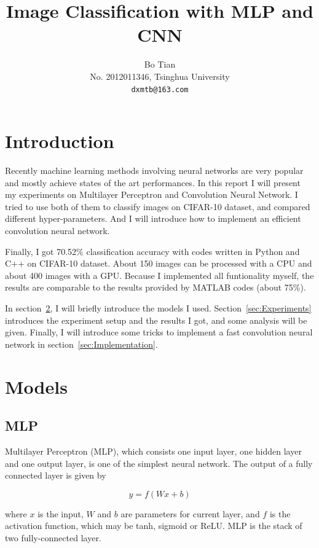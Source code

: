 \documentclass{article} %
\title{Image Classification with MLP and CNN}
\author{
Bo Tian \\
No. 2012011346,
Tsinghua University \\
\texttt{dxmtb@163.com} 
}
\begin{document}
\renewcommand{\arraystretch}{1.3}

\maketitle

\section{Introduction}

Recently machine learning methods involving neural networks are very popular and mostly achieve states of the art performances. In this report I will present my experiments on Multilayer Perceptron and Convolution Neural Network. I tried to use both of them to classify images on CIFAR-10 dataset, and compared different hyper-parameters. And I will introduce how to implement an efficient convolution neural network.

Finally, I got 70.52\% classification accuracy with codes written in Python and C++ on CIFAR-10 dataset. About 150 images can be processed with a CPU and about 400 images with a GPU. Because I implemented all funtionality myself, the results are comparable to the results provided by MATLAB codes (about 75\%).

In section~\ref{sec:Models}, I will briefly introduce the models I used. Section~\ref{sec:Experiments} introduces the experiment setup and the results I got, and some analysis will be given. Finally, I will introduce some tricks to implement a fast convolution neural network in section~\ref{sec:Implementation}.

\section{Models}

\label{sec:Models}

\subsection{MLP}

Multilayer Perceptron (MLP), which consists one input layer, one hidden layer and one output layer, is one of the simplest neural network. The output of a fully connected layer is given by

$$y=f(Wx+b)$$

where $x$ is the input, $W$ and $b$ are parameters for current layer, and $f$ is the activation function, which may be tanh, sigmoid or ReLU. MLP is the stack of two fully-connected layer.
\end{document}
